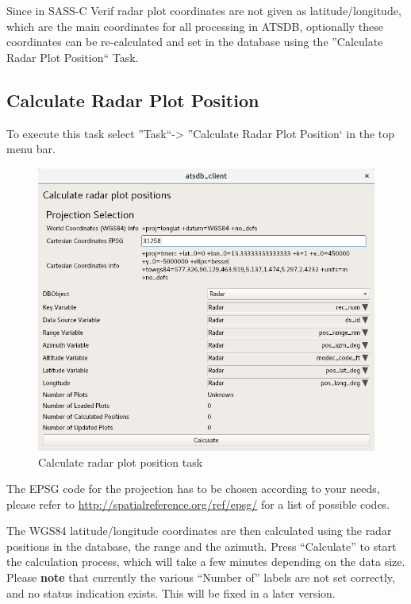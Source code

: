 \documentclass[10pt,letterpaper,extrafontsizes]{memoir}
\begin{document}
Since in SASS-C Verif radar plot coordinates are not given as latitude/longitude, which are the main coordinates for all processing in ATSDB, optionally these coordinates can be re-calculated and set in the database using the ''Calculate Radar Plot Position`` Task.

\subsection{Calculate Radar Plot Position}
To execute this task select ''Task``->  ''Calculate Radar Plot Position` in the top menu bar.

\begin{figure}[H]
  \center
    \includegraphics[width=14cm,frame]{../screenshots/task_calc_radar.png}
  \caption{Calculate radar plot position task}
  \label{fig:task_calc_radar}
\end{figure}

The EPSG code for the projection has to be chosen according to your needs, please refer to \url{http://spatialreference.org/ref/epsg/} for a list of possible codes.

The WGS84 latitude/longitude coordinates are then calculated using the radar positions in the database, the range and the azimuth. Press ``Calculate'' to start the calculation process, which will take a few minutes depending on the data size. \\

Please \textbf{note} that currently the various ``Number of'' labels are not set correctly, and no status indication exists. This will be fixed in a later version. \\
\end{document}
